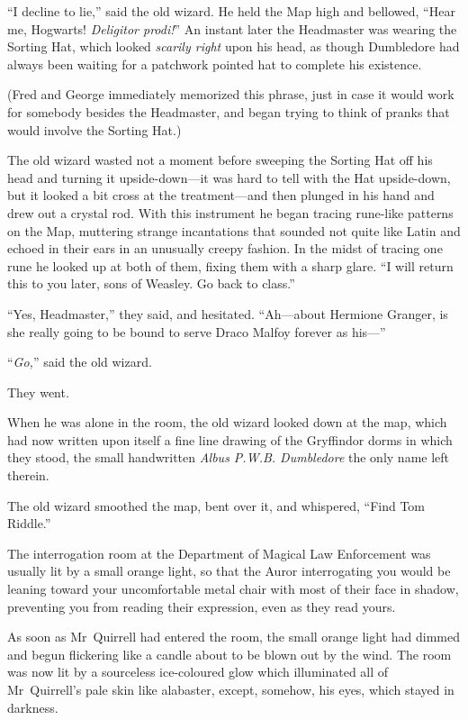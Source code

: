 “I decline to lie,” said the old wizard. He held the Map high and bellowed, “Hear me, Hogwarts! \emph{Deligitor prodi!}” An instant later the Headmaster was wearing the Sorting Hat, which looked \emph{scarily right} upon his head, as though Dumbledore had always been waiting for a patchwork pointed hat to complete his existence.

(Fred and George immediately memorized this phrase, just in case it would work for somebody besides the Headmaster, and began trying to think of pranks that would involve the Sorting Hat.)

The old wizard wasted not a moment before sweeping the Sorting Hat off his head and turning it upside-down—it was hard to tell with the Hat upside-down, but it looked a bit cross at the treatment—and then plunged in his hand and drew out a crystal rod. With this instrument he began tracing rune-like patterns on the Map, muttering strange incantations that sounded not quite like Latin and echoed in their ears in an unusually creepy fashion. In the midst of tracing one rune he looked up at both of them, fixing them with a sharp glare. “I will return this to you later, sons of Weasley. Go back to class.”

“Yes, Headmaster,” they said, and hesitated. “Ah—about Hermione Granger, is she really going to be bound to serve Draco Malfoy forever as his—”

“\emph{Go,}” said the old wizard.

They went.

When he was alone in the room, the old wizard looked down at the map, which had now written upon itself a fine line drawing of the Gryffindor dorms in which they stood, the small handwritten \emph{Albus P.W.B. Dumbledore} the only name left therein.

The old wizard smoothed the map, bent over it, and whispered, “Find Tom Riddle.”

\later

The interrogation room at the Department of Magical Law Enforcement was usually lit by a small orange light, so that the Auror interrogating you would be leaning toward your uncomfortable metal chair with most of their face in shadow, preventing you from reading their expression, even as they read yours.

As soon as Mr~Quirrell had entered the room, the small orange light had dimmed and begun flickering like a candle about to be blown out by the wind. The room was now lit by a sourceless ice-coloured glow which illuminated all of Mr~Quirrell’s pale skin like alabaster, except, somehow, his eyes, which stayed in darkness.

